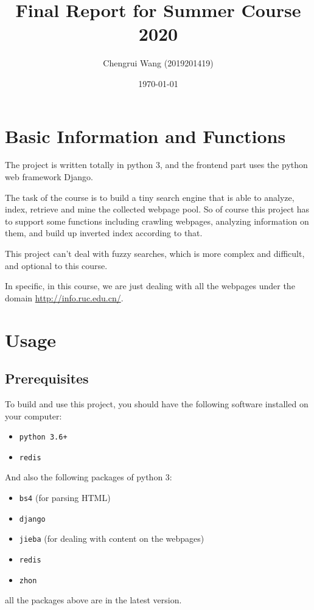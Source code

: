 \documentclass{article}
\title{Final Report for Summer Course 2020}
\author{Chengrui Wang (2019201419)}
\date{\today}
\begin{document}
    
\maketitle
\tableofcontents

\clearpage

\section{Basic Information and Functions}

The project is written totally in python 3, and the frontend part uses the python web framework Django.

The task of the course is to build a tiny search engine that is able to analyze, index, retrieve and mine the collected webpage pool. So of course this project has to support some functions including crawling webpages, analyzing information on them, and build up inverted index according to that.

This project can't deal with fuzzy searches, which is more complex and difficult, and optional to this course.

In specific, in this course, we are just dealing with all the webpages under the domain \url{http://info.ruc.edu.cn/}.

\section{Usage}

\subsection{Prerequisites}

To build and use this project, you should have the following software installed on your computer:

\begin{itemize}
    \item \texttt{python 3.6+}
    \item \texttt{redis}
\end{itemize}
And also the following packages of python 3:

\begin{itemize}
    \item \texttt{bs4} (for parsing HTML)
    \item \texttt{django}
    \item \texttt{jieba} (for dealing with content on the webpages)
    \item \texttt{redis}
    \item \texttt{zhon}
\end{itemize}
all the packages above are in the latest version.
\end{document}
